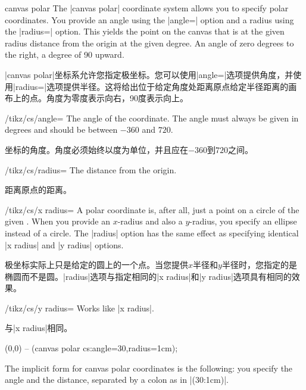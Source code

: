 \begin{coordinatesystem}{canvas polar}
    The |canvas polar| coordinate system allows you to specify polar
    coordinates. You provide an angle using the |angle=| option and a radius
    using the |radius=| option. This yields the point on the canvas that is at
    the given radius distance from the origin at the given degree. An angle of
    zero degrees to the right, a degree of 90 upward.
    
    |canvas polar|坐标系允许您指定极坐标。您可以使用|angle=|选项提供角度，并使用|radius=|选项提供半径。这将给出位于给定角度处距离原点给定半径距离的画布上的点。角度为零度表示向右，90度表示向上。
%
    \begin{key}{/tikz/cs/angle=}
        The angle of the coordinate. The angle must always be given in degrees
        and should be between $-360$ and $720$.

        坐标的角度。角度必须始终以度为单位，并且应在$-360$到$720$之间。

    \end{key}
    \begin{key}{/tikz/cs/radius=}
        The distance from the origin.

        距离原点的距离。

    \end{key}
    \begin{key}{/tikz/cs/x radius=}
        A polar coordinate is, after all, just a point on a circle of the given
        . When you provide an $x$-radius and also a $y$-radius,
        you specify an ellipse instead of a circle. The |radius| option has the
        same effect as specifying identical |x radius| and |y radius| options.

        极坐标实际上只是给定的圆上的一个点。当您提供$x$半径和$y$半径时，您指定的是椭圆而不是圆。|radius|选项与指定相同的|x radius|和|y radius|选项具有相同的效果。
    \end{key}
    \begin{key}{/tikz/cs/y radius=}
        Works like |x radius|.

        与|x radius|相同。

    \end{key}
\begin{codeexample}[]
\tikz \draw (0,0) -- (canvas polar cs:angle=30,radius=1cm);
\end{codeexample}

    The implicit form for canvas polar coordinates is the following: you
    specify the angle and the distance, separated by a colon as in |(30:1cm)|.


\end{coordinatesystem}
